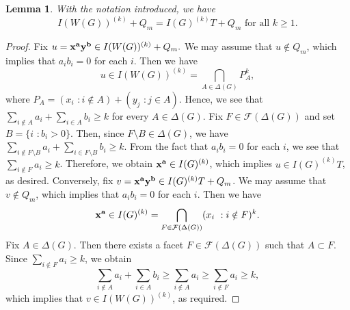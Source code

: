 \documentclass[12pt]{amsart}
\newtheorem{lemma}[thm]{Lemma}
\theoremstyle{definition}
\theoremstyle{remark}
\begin{document}
\begin{lemma}\label{lemma1}
With the notation introduced, we have 
$$I(W(G))^{(k)}+Q_{m}=I(G)^{(k)}T+Q_{m}\mbox{ for all }k\geq1.$$
\end{lemma}
\begin{proof}
Fix $u={\bf x}^{\bf a}{\bf y}^{\bf b}\in I(W(G))^{(k)}+Q_{m}.$ We may assume that $u\notin Q_{m}$, which implies that $a_{i}b_{i}=0$ for each $i$. Then we have 
$$u\in I(W(G))^{(k)}=\bigcap_{A\in\Delta(G)}P_{A}^{k},$$
where $P_{A}=(x_{i}\,\,: i\notin A)+(y_{j}\,\,: j\in A)$. Hence, we see that $\sum_{i\notin A}a_{i}+\sum_{i\in A}b_{i}\geq k$ for every $A\in\Delta(G)$. Fix $F\in\mathcal{F}(\Delta(G))$ and set $B=\{i\,\,: b_{i}>0\}$. Then, since $F\setminus B\in\Delta(G)$, we have $\sum_{i\notin F\setminus B}a_{i}+\sum_{i\in F\setminus B}b_{i}\geq k$. From the fact that $a_{i}b_{i}=0$ for each $i$, we see that $\sum_{i\notin F}a_{i}\geq k$. Therefore, we obtain ${\bf x}^{\bf a}\in I(G)^{(k)}$, which implies $u\in I(G)^{(k)}T$, as desired. Conversely, fix $v={\bf x}^{\bf a}{\bf y}^{\bf b}\in I(G)^{(k)}T+Q_{m}$. We may assume that $v\notin Q_{m}$, which implies that $a_{i}b_{i}=0$ for each $i$. Then we have 
$${\bf x}^{\bf a}\in I(G)^{(k)}=\bigcap_{F\in\mathcal{F}(\Delta(G))}(x_{i}\,\,: i\notin F)^{k}.$$Fix $A\in\Delta(G)$. Then there exists a facet $F\in\mathcal{F}(\Delta(G))$ such that $A\subset F$. Since $\sum_{i\notin F}a_{i}\geq k$, we obtain 
$$\sum_{i\notin A}a_{i}+\sum_{i\in A}b_{i}\geq\sum_{i\notin A}a_{i}\geq\sum_{i\notin F}a_{i}\geq k,$$
which implies that $v\in I(W(G))^{(k)}$, as required. 
\end{proof}
\end{document}
